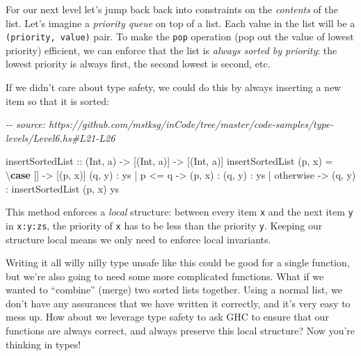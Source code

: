 \documentclass[]{article}
\newenvironment{Shaded}{}{}
\newcommand{\CommentTok}[1]{\textcolor[rgb]{0.38,0.63,0.69}{\textit{#1}}}
\newcommand{\DataTypeTok}[1]{\textcolor[rgb]{0.56,0.13,0.00}{#1}}
\newcommand{\FunctionTok}[1]{\textcolor[rgb]{0.02,0.16,0.49}{#1}}
\newcommand{\KeywordTok}[1]{\textcolor[rgb]{0.00,0.44,0.13}{\textbf{#1}}}
\newcommand{\NormalTok}[1]{#1}
\newcommand{\OperatorTok}[1]{\textcolor[rgb]{0.40,0.40,0.40}{#1}}
\newcommand{\OtherTok}[1]{\textcolor[rgb]{0.00,0.44,0.13}{#1}}
\begin{document}
For our next level let's jump back back into constraints on the \emph{contents}
of the list. Let's imagine a \emph{priority queue} on top of a list. Each value
in the list will be a \texttt{(priority,\ value)} pair. To make the \texttt{pop}
operation (pop out the value of lowest priority) efficient, we can enforce that
the list is \emph{always sorted by priority}: the lowest priority is always
first, the second lowest is second, etc.

If we didn't care about type safety, we could do this by always inserting a new
item so that it is sorted:

\begin{Shaded}
\begin{Highlighting}[]
\CommentTok{{-}{-} source: https://github.com/mstksg/inCode/tree/master/code{-}samples/type{-}levels/Level6.hs\#L21{-}L26}

\OtherTok{insertSortedList ::}\NormalTok{ (}\DataTypeTok{Int}\NormalTok{, a) }\OtherTok{{-}\textgreater{}}\NormalTok{ [(}\DataTypeTok{Int}\NormalTok{, a)] }\OtherTok{{-}\textgreater{}}\NormalTok{ [(}\DataTypeTok{Int}\NormalTok{, a)]}
\NormalTok{insertSortedList (p, x) }\OtherTok{=}\NormalTok{ \textbackslash{}}\KeywordTok{case}
\NormalTok{  [] }\OtherTok{{-}\textgreater{}}\NormalTok{ [(p, x)]}
\NormalTok{  (q, y) }\OperatorTok{:}\NormalTok{ ys}
    \OperatorTok{|}\NormalTok{ p }\OperatorTok{\textless{}=}\NormalTok{ q }\OtherTok{{-}\textgreater{}}\NormalTok{ (p, x) }\OperatorTok{:}\NormalTok{ (q, y) }\OperatorTok{:}\NormalTok{ ys}
    \OperatorTok{|} \FunctionTok{otherwise} \OtherTok{{-}\textgreater{}}\NormalTok{ (q, y) }\OperatorTok{:}\NormalTok{ insertSortedList (p, x) ys}
\end{Highlighting}
\end{Shaded}

This method enforces a \emph{local} structure: between every item \texttt{x} and
the next item \texttt{y} in \texttt{x:y:zs}, the priority of \texttt{x} has to
be less than the priority \texttt{y}. Keeping our structure local means we only
need to enforce local invariants.

Writing it all willy nilly type unsafe like this could be good for a single
function, but we're also going to need some more complicated functions. What if
we wanted to ``combine'' (merge) two sorted lists together. Using a normal list,
we don't have any assurances that we have written it correctly, and it's very
easy to mess up. How about we leverage type safety to ask GHC to ensure that our
functions are always correct, and always preserve this local structure? Now
you're thinking in types!
\end{document}
